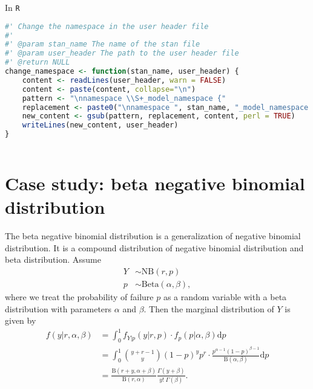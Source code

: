 \documentclass[11pt]{article}
\begin{document}
In \verb|R|
\begin{lstlisting}[language=R, style=lgeneral]
#' Change the namespace in the user header file
#' 
#' @param stan_name The name of the stan file
#' @param user_header The path to the user header file
#' @return NULL
change_namespace <- function(stan_name, user_header) {
    content <- readLines(user_header, warn = FALSE)
    content <- paste(content, collapse="\n")
    pattern <- "\nnamespace \\S+_model_namespace {"
    replacement <- paste0("\nnamespace ", stan_name, "_model_namespace {")
    new_content <- gsub(pattern, replacement, content, perl = TRUE)
    writeLines(new_content, user_header)
}
	
\end{lstlisting}













\section{Case study: beta negative binomial distribution}

The beta negative binomial distribution is a generalization of negative binomial distribution. It is a compound distribution of negative binomial distribution and beta distribution. Assume
\begin{equation*}
  \begin{aligned}
  Y &\sim \text{NB}(r,p) \\
  p &\sim {\textrm {Beta}}(\alpha ,\beta ),
  \end{aligned}
\end{equation*}
where we treat the probability of failure $p$ as a random variable with a beta distribution with parameters $\alpha$ and $\beta$. Then the marginal distribution of $Y$ is given by
\begin{equation}
  \begin{aligned}
  f(y|r, \alpha ,\beta) &=\int _{0}^{1}f_{Y|p}(y|r,p)\cdot f_{p}(p|\alpha ,\beta )\mathrm {d} p \\ 
  &=\int _{0}^{1}{\binom {y+r-1}{y}}(1-p)^{y}p^{r}\cdot {\frac {p^{\alpha -1}(1-p)^{\beta -1}}{\mathrm {B} (\alpha ,\beta )}}\mathrm {d} p \\
  &= {\frac {\mathrm {B} (r+y,\alpha +\beta )}{\mathrm {B} (r,\alpha )}}{\frac {\Gamma (y+\beta )}{y!\;\Gamma (\beta )}}.
  \end{aligned}
\end{equation}
\end{document}

